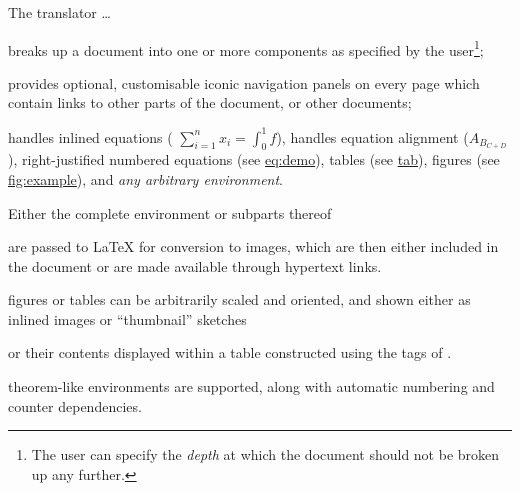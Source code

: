 \smallskip\noindent
The \latextohtml{} translator \dots
%
\begin{itemize}
\item 
breaks up a document into one or more components as specified
by the user\footnote{The user can specify the \emph{depth} at which 
the document should not be broken up any further.};

%
\item 
provides optional, customisable iconic navigation
panels on every page which contain links to other parts of the
document, or other documents;

%
%
%
\item 
handles inlined equations ( \(\sum_{i=1}^{n} x_{i} = \int_{0}^{1} f \)), 
handles equation alignment ($A_{B_{C+D}}$), 
right-justified numbered equations (see \hyperref{example}{equation~}{}{eq:demo}), 
tables (see \hyperref{example}{Table~}{}{tab}), 
figures (see \hyperref{example}{Figure~}{}{fig:example}),
and \emph{any arbitrary environment}.
\begin{changebar}%
Either the complete environment or subparts thereof\html{\dots}
\end{changebar}%
are passed to \LaTeX{}  for conversion to images, which are then either included
in the document or are made available through hypertext links.

%
%
%
\begin{changebar}%
\item 
figures or tables can be arbitrarily scaled and oriented, 
and shown either as inlined images or ``thumbnail'' sketches\html{\dots}
\begin{changebar}
or their contents displayed within a table constructed
using the  tags of \HTMLiii.
\end{changebar}\end{changebar}

%
%
%
%
\begin{changebar}
\item
theorem-like environments are supported, along with
automatic numbering and counter dependencies.
\end{changebar}%


\end{itemize}

